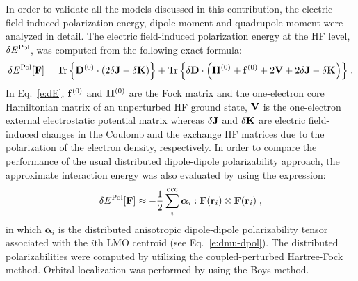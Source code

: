 \documentclass[aip,jcp,preprint,amsmath,amssymb,floatfix]{revtex4-1}
\newcommand{\BM}[1]{\bm{#1}}
\DeclareMathOperator{\Tr}{Tr}
\begin{document}
In order to validate all the models discussed in this contribution,
the electric field\hyp{}induced polarization energy, 
dipole moment and quadrupole moment were analyzed in detail.
The electric field\hyp{}induced polarization energy at the HF level, $\delta E^{\rm Pol}$,
was computed from the following exact formula:
%
\begin{equation}\label{e:dE}
 \delta E^{\rm Pol}[{\bf F}] = 
                     \Tr{\left\{ {\bf D}^{(0)} \cdot
                                \left( 2\delta {\bf J} - \delta {\bf K}  \right) \right\}} %
                   + \Tr{\left\{ \delta {\bf D} \cdot
                                \left( {\bf H}^{(0)} + {\bf f}^{(0)} + 2{\bf V} + 2\delta {\bf J} - \delta {\bf K}\right) \right\}} \;.
\end{equation}
%
In Eq.~\eqref{e:dE}, ${\bf f}^{(0)}$ and ${\bf H}^{(0)}$ are the Fock matrix and 
the one\hyp{}electron core Hamiltonian matrix of an unperturbed HF ground state,
${\bf V}$ is the one\hyp{}electron external electrostatic potential matrix whereas $\delta {\bf J}$
and $\delta {\bf K}$ are electric field\hyp{}induced changes in the Coulomb and the exchange HF matrices due to 
the polarization of the electron density, respectively. 
In order to compare the performance of the usual 
distributed dipole\hyp{}dipole polarizability approach,\cite{Li.Netzloff.Gordon.JCP.2006}
the approximate interaction energy was also evaluated by using the expression:
%
\begin{equation}\label{e:dE-dpol}
 \delta E^{\rm Pol}[{\bf F}] \approx 
                   - \frac{1}{2} \sum_i^{\rm occ} {\BM \alpha}_i : {\bf F}({\bf r}_i) \otimes {\bf F}({\bf r}_i) \;,
\end{equation}
%
in which ${\BM \alpha}_i$ is the distributed anisotropic dipole\hyp{}dipole polarizability tensor associated with the
$i$th LMO centroid (see Eq.~\eqref{e:dmu-dpol}).
The distributed polarizabilities were computed by utilizing the coupled\hyp{}perturbed Hartree\hyp{}Fock
method.\cite{McWeeny.RevModPhys.1960,Dodds.McWeeney.Sadlej.MolPhys.1977} 
Orbital localization was performed by using the Boys method.\cite{Boys.RevModPhys.1960} 
\end{document}
